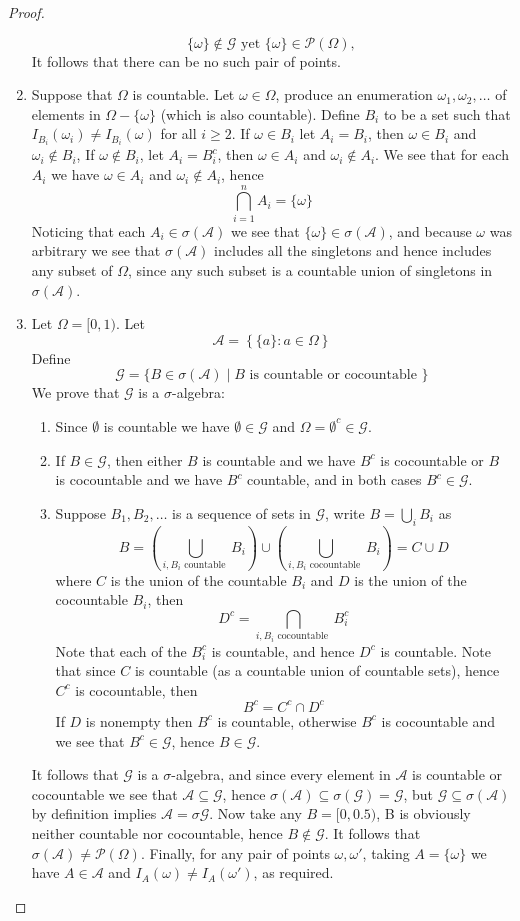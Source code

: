 \documentclass[12pt]{article}
\newcommand{\A}{\mathcal{A}}
\newcommand{\G}{\mathcal{G}}
\newcommand{\seq}{\subseteq}
\newcommand{\om}{\omega}
\newcommand{\Om}{\Omega}
\newcommand{\es}{\emptyset}
\newcommand{\mc}{\mathcal}
\newcommand{\un}{\cup}
\newcommand{\ic}{\cap}
\begin{document}
\begin{proof}
\begin{enumerate}
        \[ \{ \om \} \notin \G \text { yet } \{ \om \} \in \mc P (\Om), \]
        It follows that there can be no such pair of points.
        \item Suppose that $\Om$ is countable. Let $\om \in \Om$, produce an enumeration $\om_1, \om_2, \ldots$ of elements in $\Om - \{ \om \}$ (which is also countable). Define $B_{i}$ to be a set such that $I_{B_i} (\om_i) \neq I_{B_i} (\om)$ for all $i \geq 2$. If $\om \in B_i$ let $A_i = B_i$, then $\om \in B_i$ and $\om_i \notin B_i$, If $\om \notin B_i$, let $A_i = B_i^{c}$, then $\om \in A_i$ and $\om_i \notin A_i$. We see that for each $A_{i}$ we have $\om \in A_i$ and $\om_i \notin A_i$, hence
        \[ \bigcap_{i=1}^{n} A_i = \{ \om \} \]
        Noticing that each $A_i \in \sigma (\A)$ we see that $\{ \om \} \in \sigma (\A)$, and because $\om$ was arbitrary we see that $\sigma (\A)$ includes all the singletons and hence includes any subset of $\Om$, since any such subset is a countable union of singletons in $\sigma (\A)$. 
        \item Let $\Om = [0, 1)$. Let 
        \[ \A = \left \{ \{ a \} : a \in \Om \right \} \]
        Define
        \[ \G = \{ B \in \sigma (\A) \mid B \text { is countable  or cocountable    } \} \]
        We prove that $\G$ is a $\sigma$-algebra:
        \begin{enumerate}
            \item Since $\es$ is countable we have $\es \in \G$ and $\Om = \es^{c} \in \G$.
            \item If $B \in \G$, then either $B$ is countable and we have $B^{c}$ is cocountable or $B$ is cocountable and we have $B^{c}$ countable, and in both cases $B^{c} \in \G$. 
            \item Suppose $B_1, B_2, \ldots$ is a sequence of sets in $\G$, write $B = \bigcup_i B_i$ as
            \[ B = \left ( \bigcup_{i, B_i \text { countable }} B_i \right ) \un \left ( \bigcup_{i, B_i \text { cocountable }} B_i \right ) = C \un D \]
            where $C$ is the union of the countable $B_i$ and $D$ is the union of the cocountable $B_i$, then
            \[ D^{c} = \bigcap_{i, B_i \text { cocountable }} B_i^{c}  \]
            Note that each of the $B_i^{c}$ is countable, and hence $D^{c}$ is countable. Note that since $C$ is countable (as a countable union of countable sets), hence $C^{c}$ is cocountable, then
            \[ B^{c} = C^{c} \ic D^{c} \]
            If $D$ is nonempty then $B^{c}$ is countable, otherwise $B^{c}$ is cocountable and we see that $B^c \in \G$, hence $B \in \G$.
        \end{enumerate}
        It follows that $\G$ is a $\sigma$-algebra, and since every element in $\A$ is countable or cocountable we see that $\A \seq \G$, hence $\sigma (\A) \seq \sigma (\G) = \G$, but $\G \seq \sigma (\A)$ by definition implies $\A = \sigma \G$. Now take any $B = [0, 0.5)$, B is obviously neither countable nor cocountable, hence $B \notin \G$. It follows that $\sigma (\A) \neq \mc P (\Om)$. Finally, for any pair of points $\om, \om'$, taking $A = \{ \om \}$ we have $A \in \A$ and $I_A (\om) \neq I_A (\om')$, as required.
    \end{enumerate}
\end{proof}
\end{document}
